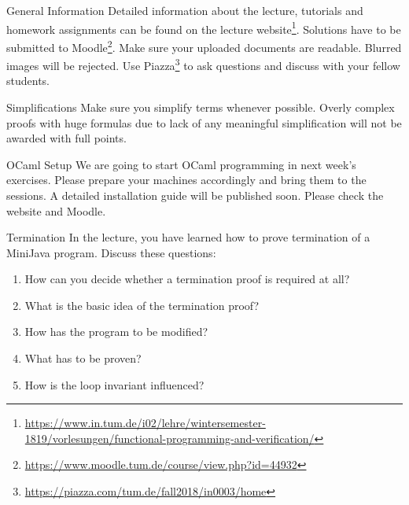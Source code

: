 \documentclass[
  english
]{tumteaching}
\begin{document}
\verticalline
\begin{disclaimer}{General Information}
	Detailed information about the lecture, tutorials and homework assignments can be found on the lecture website\footnote{\url{https://www.in.tum.de/i02/lehre/wintersemester-1819/vorlesungen/functional-programming-and-verification/}}. Solutions have to be submitted to Moodle\footnote{\url{https://www.moodle.tum.de/course/view.php?id=44932}}. Make sure your uploaded documents are readable. Blurred images will be rejected. Use Piazza\footnote{\url{https://piazza.com/tum.de/fall2018/in0003/home}} to ask questions and discuss with your fellow students.
\end{disclaimer}

\verticalline
\vspace*{-5mm}

\begin{disclaimer}{Simplifications}
	Make sure you simplify terms whenever possible. Overly complex proofs with huge formulas due to lack of any meaningful simplification will not be awarded with full points.
\end{disclaimer}

\verticalline
\vspace*{-5mm}

\begin{disclaimer}{OCaml Setup}
	We are going to start OCaml programming in next week's exercises. Please prepare your machines accordingly and bring them to the sessions. A detailed installation guide will be published soon. Please check the website and Moodle.
\end{disclaimer}

\verticalline

\begin{assignment}[L]{Termination}
In the lecture, you have learned how to prove termination of a MiniJava program. Discuss these questions:
	\begin{enumerate}
		\item How can you decide whether a termination proof is required at all?
		\item What is the basic idea of the termination proof?
		\item How has the program to be modified?
		\item What has to be proven?
		\item How is the loop invariant influenced?
	\end{enumerate}		

	
\end{assignment}
\end{document}
